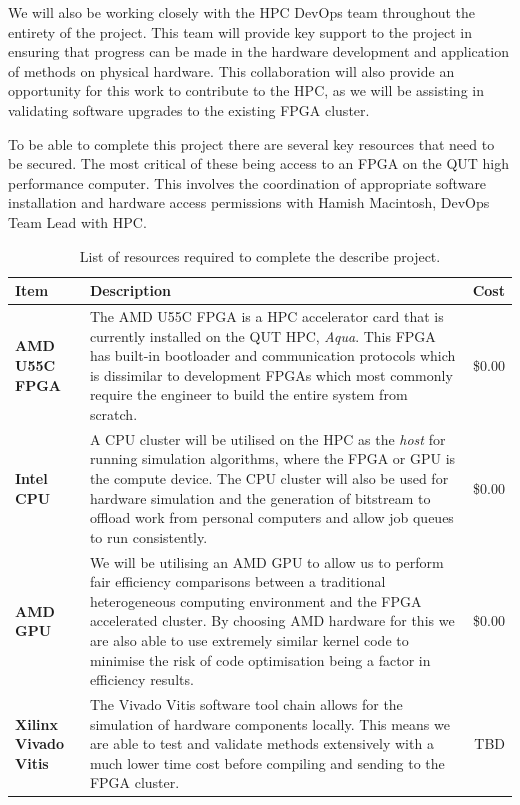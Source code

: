 \documentclass[11pt, a4paper]{article}
\begin{document}
	We will also be working closely with the HPC DevOps team throughout the entirety of the project. This team will provide key support to the project in ensuring that progress can be made in the hardware development and application of methods on physical hardware. This collaboration will also provide an opportunity for this work to contribute to the HPC, as we will be assisting in validating software upgrades to the existing FPGA cluster.
	
	To be able to complete this project there are several key resources that need to be secured. The most critical of these being access to an FPGA on the QUT high performance computer. This involves the coordination of appropriate software installation and hardware access permissions with Hamish Macintosh, DevOps Team Lead with HPC. 
	
	\begin{table}[h!]
		\begin{tabularx}{\textwidth}{|l|X|r|}\hline
			Item & Description & Cost \\\hline
			\textbf{AMD U55C FPGA} & The AMD U55C FPGA is a HPC accelerator card that is currently installed on the QUT HPC, \textit{Aqua}. This FPGA has built-in bootloader and communication protocols which is dissimilar to development FPGAs which most commonly require the engineer to build the entire system from scratch. & \$0.00 \\
			\textbf{Intel CPU} & A CPU cluster will be utilised on the HPC as the \textit{host} for running simulation algorithms, where the FPGA or GPU is the compute device. The CPU cluster will also be used for hardware simulation and the generation of bitstream to offload work from personal computers and allow job queues to run consistently. & \$0.00 \\
			\textbf{AMD GPU} & We will be utilising an AMD GPU to allow us to perform fair efficiency comparisons between a traditional heterogeneous computing environment and the FPGA accelerated cluster. By choosing AMD hardware for this we are also able to use extremely similar kernel code to minimise the risk of code optimisation being a factor in efficiency results. & \$0.00 \\
			\textbf{Xilinx Vivado Vitis} & The Vivado Vitis software tool chain allows for the simulation of hardware components locally. This means we are able to test and validate methods extensively with a much lower time cost before compiling and sending to the FPGA cluster. & TBD \\\hline
		\end{tabularx}	
		\caption{List of resources required to complete the describe project.}
	\end{table}
	
\end{document}
